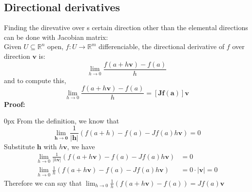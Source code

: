 \documentclass{article}
\begin{document}
\subsection{Directional derivatives}
Finding the direvative over s certain direction other than the elemental directions can be done with Jacobian matrix:\\
Given $U \subseteq \mathbb{R}^n$ open, $f: U \rightarrow \mathbb{R}^m$ differenciable, the directional derivative of $f$ over direction $\mathbf{v}$ is:
\begin{equation*}
    \lim_{h\rightarrow 0}\frac{f(a+h\mathbf{v})-f(a)}{h}
\end{equation*}
and to compute this,
\begin{equation*}
    \lim_{h\rightarrow 0}\frac{f(a+h\mathbf{v})-f(a)}{h} = [\mathbf{Jf(a)}]\mathbf{v}
\end{equation*}
\textbf{Proof:}
\begin{addmargin}[10px]{0px}
    From the definition, we know that 
    \begin{equation*}
        \lim_{\mathbf{h\rightarrow 0}}\frac{1}{|\mathbf{h}|}\left(
            f(a+h)-f(a) - Jf(a)h\mathbf{v}
        \right) = 0
    \end{equation*}
    Substitute $\mathbf{h}$ with $h\mathbf{v}$, we have
    \begin{equation*}
        \begin{split}
            \lim_{h\rightarrow 0}\frac{1}{|h\mathbf{v}|}(
                f(a+h\mathbf{v}) - f(a) - Jf(a)h\mathbf{v}
            ) &= 0 \\
            \lim_{h\rightarrow 0}\frac{1}{h}(f(a+h\mathbf{v}) - f(a) - Jf(a)h\mathbf{v}) &= 0\cdot |\mathbf{v}| = 0
        \end{split}
    \end{equation*}
    Therefore we can say that $\lim_{h\rightarrow 0}\frac{1}{h}(f(a+h\mathbf{v}) - f(a)) = Jf(a)\mathbf{v}$
\end{addmargin}
\end{document}
